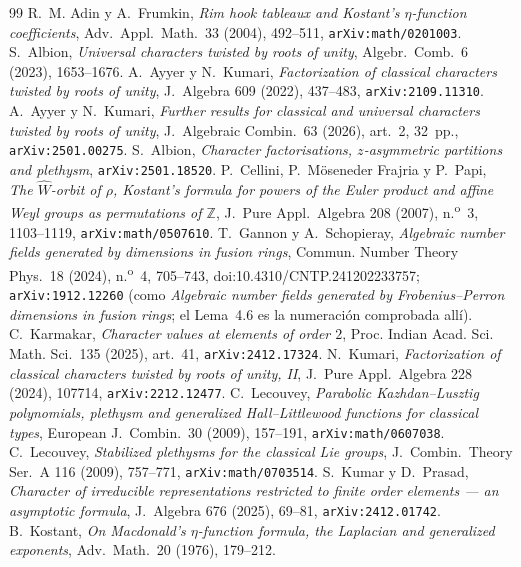 \documentclass[11pt,a4paper]{article}
\begin{document}
\begin{thebibliography}{99}\small
{} R.~M. Adin y A.~Frumkin, \emph{Rim hook tableaux and Kostant's $\eta$-function
coefficients}, Adv.~Appl.~Math.~33 (2004), 492--511, \texttt{arXiv:math/0201003}.
 S.~Albion, \emph{Universal characters twisted by roots of unity}, Algebr.~Comb.~6
(2023), 1653--1676.
 A.~Ayyer y N.~Kumari, \emph{Factorization of classical characters twisted by roots
of unity}, J.~Algebra 609 (2022), 437--483, \texttt{arXiv:2109.11310}.
 A.~Ayyer y N.~Kumari, \emph{Further results for classical and universal characters
twisted by roots of unity}, J.~Algebraic Combin.~63 (2026), art.~2, 32~pp., \texttt{arXiv:2501.00275}.
 S.~Albion, \emph{Character factorisations, $z$-asymmetric partitions and plethysm},
\texttt{arXiv:2501.18520}.
 P.~Cellini, P.~Möseneder Frajria y P.~Papi, \emph{The $\widehat W$-orbit of $\rho$,
Kostant's formula for powers of the Euler product and affine Weyl groups as permutations of
$\mathbb{Z}$}, J.~Pure Appl.~Algebra 208 (2007), n.\textsuperscript{o}~3, 1103--1119, \texttt{arXiv:math/0507610}.
 T.~Gannon y A.~Schopieray, \emph{Algebraic number fields generated by dimensions in fusion rings}, Commun. Number Theory Phys.~18 (2024), n.\textsuperscript{o}~4, 705--743, doi:10.4310/CNTP.241202233757; \texttt{arXiv:1912.12260} (como \emph{Algebraic number fields generated by Frobenius--Perron dimensions in fusion rings}; el Lema~4.6 es la numeración comprobada allí).
 C.~Karmakar, \emph{Character values at elements of order $2$},
Proc. Indian Acad. Sci. Math. Sci.~135 (2025), art.~41, \texttt{arXiv:2412.17324}.
 N.~Kumari, \emph{Factorization of classical characters twisted by roots of unity,
II}, J.~Pure Appl.~Algebra 228 (2024), 107714, \texttt{arXiv:2212.12477}.
 C.~Lecouvey, \emph{Parabolic Kazhdan--Lusztig polynomials, plethysm and generalized
Hall--Littlewood functions for classical types}, European J.~Combin.~30 (2009), 157--191, \texttt{arXiv:math/0607038}.
 C.~Lecouvey, \emph{Stabilized plethysms for the classical Lie groups},
J.~Combin.~Theory Ser.~A 116 (2009), 757--771, \texttt{arXiv:math/0703514}.
 S.~Kumar y D.~Prasad, \emph{Character of irreducible representations restricted
to finite order elements --- an asymptotic formula}, J.~Algebra 676 (2025), 69--81, \texttt{arXiv:2412.01742}.
 B.~Kostant, \emph{On Macdonald's $\eta$-function formula, the Laplacian and
generalized exponents}, Adv.~Math.~20 (1976), 179--212.

\end{thebibliography}
\end{document}
